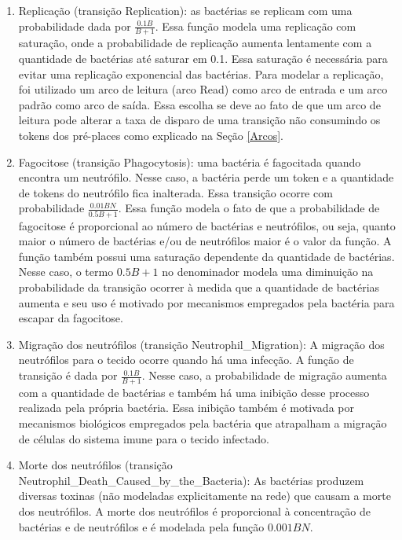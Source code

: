 \documentclass[a4paper,10pt]{article}
\begin{document}
		\begin{enumerate}
		  \item Replicação (transição Replication): as bactérias se replicam com uma probabilidade dada por
		  $\frac{0.1 B}{B + 1}$. Essa função modela uma replicação com saturação, onde a probabilidade de
		  replicação aumenta lentamente com a quantidade de bactérias até saturar em 0.1. Essa
		  saturação é necessária para evitar uma replicação exponencial das bactérias. Para modelar a
		  replicação, foi utilizado um arco de leitura (arco Read) como arco de entrada e um arco padrão
		  como arco de saída. Essa escolha se deve ao fato de que um arco de leitura pode alterar a taxa
		  de disparo de uma transição não consumindo os tokens dos pré-places como explicado na
		  Seção \ref{Arcos}. 
		  \item Fagocitose (transição Phagocytosis): uma bactéria é fagocitada quando encontra um neutrófilo.
		  Nesse caso, a bactéria perde um token e a quantidade de tokens do neutrófilo fica inalterada.
		  Essa transição ocorre com probabilidade $\frac{0.01 B N}{0.5 B + 1}$. Essa função modela o fato de que
		  a probabilidade de fagocitose é proporcional ao número de bactérias e neutrófilos, ou seja,
		  quanto maior o número de bactérias e/ou de neutrófilos maior é o valor da função. A função
		  também possui uma saturação dependente da quantidade de bactérias. Nesse caso, o termo
		  $0.5 B + 1$ no denominador modela uma diminuição na probabilidade da transição ocorrer à
		  medida que a quantidade de bactérias aumenta e seu uso é motivado por mecanismos
		  empregados pela bactéria para escapar da fagocitose.
		  \item Migração dos neutrófilos (transição Neutrophil\_Migration): A migração dos neutrófilos para o tecido 
		  ocorre quando há uma infecção. A função de transição é dada por $\frac{0.1 B}{B + 1}$. Nesse caso, a probabilidade 
		  de migração aumenta com a quantidade de bactérias e também há uma inibição desse processo realizada 
		  pela própria bactéria. Essa inibição também é motivada por mecanismos biológicos empregados pela bactéria 
		  que atrapalham a migração de células do sistema imune para o tecido infectado. 
		  \item Morte dos neutrófilos (transição Neutrophil\_Death\_Caused\_by\_the\_Bacteria): As bactérias produzem 
		  diversas toxinas (não modeladas explicitamente na rede) que causam a morte dos neutrófilos. 
		  A morte dos neutrófilos é proporcional à concentração de bactérias e de neutrófilos e é modelada pela 
		  função $0.001 B N$. 
		\end{enumerate}
		
\end{document}

